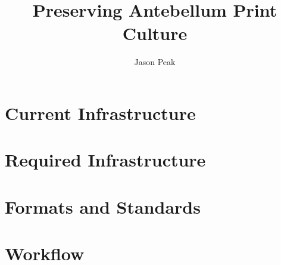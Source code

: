 \documentclass[oneside]{article}
\begin{document}
\title{Preserving Antebellum Print Culture}
\author{Jason Peak}


\def\projectname{Poe's Magazine World}
\def\apc{Antebellum Print Culture}
\def\bwj{\emph{The Broadway Journal}}
\def\slm{\emph{Southern Literary Messenger}}
\def\bgm{\emph{Burton's Gentleman's Magazine}}
\def\gm{\emph{Graham's Magazine}}
\def\maglist{\bgm, \bwj, \gm, and the \slm}

\def\needcite{[citation]}
\def\needswork{[needs much work for inclusion]}

%

%

%




%
\section{Current Infrastructure}


\section{Required Infrastructure}



\section{Formats and Standards}


\section{Workflow}

\end{document}
